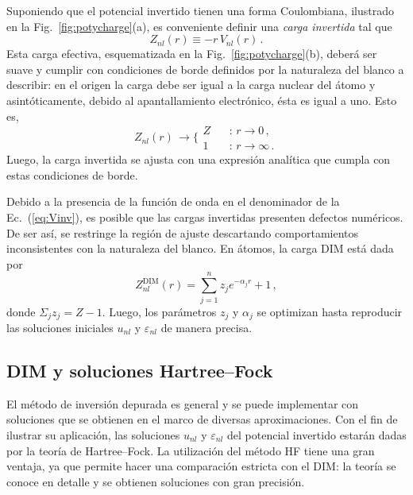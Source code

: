 Suponiendo que el potencial invertido tienen una forma Coulombiana, 
ilustrado en la Fig.~\ref{fig:potycharge}(a), es conveniente definir una 
\textit{carga invertida} tal que
\begin{equation}
Z_{nl}(r) \equiv -r \, V_{nl}(r) \,.
\label{eq:Zinv}
\end{equation}
Esta carga efectiva, esquematizada en la Fig.~\ref{fig:potycharge}(b), 
deberá ser suave y cumplir con condiciones de borde definidos por la 
naturaleza del blanco a describir: en el origen la carga debe 
ser igual a la carga nuclear del átomo y asintóticamente, debido al 
apantallamiento electrónico, ésta es igual a uno. Esto es,
\begin{equation}
Z_{nl}(r) \, \rightarrow 
\bigg\{ 
\begin{array}{ll}
Z  \ \  & \ \ \text{:\ \ }r  \rightarrow 0 \,, \\ 
1           & \ \ \text{:\ \ }r  \rightarrow \infty \,.
\end{array}
\label{eq:Zasympt}
\end{equation} 
Luego, la carga invertida se ajusta con una expresión analítica que 
cumpla con estas condiciones de borde.

Debido a la presencia de la función de onda en 
el denominador de la Ec.~(\ref{eq:Vinv}), es posible que las cargas 
invertidas presenten defectos numéricos. De ser así, se restringe la 
región de ajuste descartando comportamientos inconsistentes con la 
naturaleza del blanco. En átomos, la carga DIM está dada por
\begin{equation}
Z_{nl}^{\mathrm{DIM}}(r)= \sum_{j=1}^{n} z_j e^{-\alpha_j r}+1 \,,
\label{eq:atomzDIM}
\end{equation}
donde $\Sigma_j z_j=Z-1$. Luego, los parámetros $z_j$ y $\alpha_j$ 
se optimizan hasta reproducir las soluciones iniciales $u_{nl}$ y 
$\varepsilon_{nl}$ de manera precisa. 

\subsection{DIM y soluciones Hartree--Fock}
\label{subsec:invHF}

El método de inversión depurada es general y se puede implementar con 
soluciones que se obtienen en el marco de diversas aproximaciones. Con 
el fin de ilustrar su aplicación, las soluciones $u_{nl}$ y 
$\varepsilon_{nl}$ del potencial invertido estarán dadas por la teoría 
de Hartree--Fock. La utilización del método HF tiene una gran ventaja, 
ya que permite hacer una comparación estricta con el DIM: la teoría se 
conoce en detalle y se obtienen soluciones con gran precisión.

